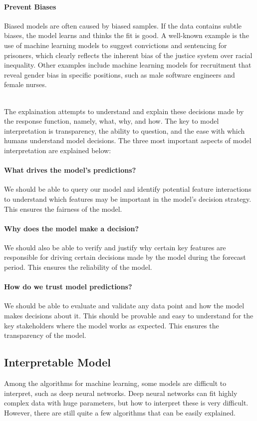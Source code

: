 \paragraph{Prevent Biases}
Biased models are often caused by biased samples. If the data contains subtle biases, the model learns and thinks the fit is good. A well-known example is the use of machine learning models to suggest convictions and sentencing for prisoners, which clearly reflects the inherent bias of the justice system over racial inequality. Other examples include machine learning models for recruitment that reveal gender bias in specific positions, such as male software engineers and female nurses.

~\\
The explaination attempts to understand and explain these decisions made by the response function, namely, what, why, and how. The key to model interpretation is transparency, the ability to question, and the ease with which humans understand model decisions. The three most important aspects of model interpretation are explained below:
\paragraph{What drives the model's predictions?}
 We should be able to query our model and identify potential feature interactions to understand which features may be important in the model's decision strategy. This ensures the fairness of the model.
\paragraph{Why does the model make a decision?}
We should also be able to verify and justify why certain key features are responsible for driving certain decisions made by the model during the forecast period. This ensures the reliability of the model.
\paragraph{How do we trust model predictions?}
We should be able to evaluate and validate any data point and how the model makes decisions about it. This should be provable and easy to understand for the key stakeholders where the model works as expected. This ensures the transparency of the model.

\subsection{Interpretable Model}
Among the algorithms for machine learning, some models are difficult to interpret, such as deep neural networks. Deep neural networks can fit highly complex data with huge parameters, but how to interpret these is very difficult. However, there are still quite a few algorithms that can be easily explained.


